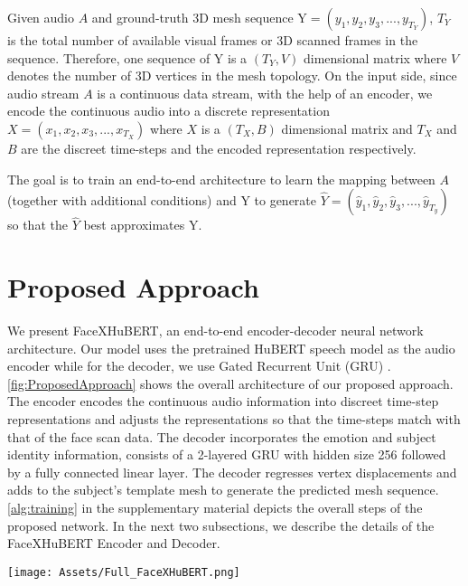 \documentclass[10pt,twocolumn,letterpaper]{article}
\begin{document}
Given audio $A$ and ground-truth 3D mesh sequence Y$ = (y_1, y_2, y_3,..., y_{T_Y})$, $T_Y$ is the total number of available visual frames or 3D scanned frames in the sequence. Therefore, one sequence of Y is a $(T_Y, V)$ dimensional matrix where $V$ denotes the number of 3D vertices in the mesh topology. On the input side, since audio stream $A$ is a continuous data stream, with the help of an encoder, we encode the continuous audio into a discrete representation $X = (x_1, x_2, x_3,..., x_{T_X})$ where $X$ is a $(T_X, B)$ dimensional matrix and $T_X$ and $B$ are the discreet time-steps and the encoded representation respectively. 

The goal is to train an end-to-end architecture to learn the mapping between $A$ (together with additional conditions) and Y to generate $\hat{Y} = (\hat{y}_1, \hat{y}_2,\hat{y}_3,..., \hat{y}_{T_y})$ so that the $\hat{Y}$ best approximates Y. 

\section{Proposed Approach}
\label{sec:proposedapproach}
We present FaceXHuBERT, an end-to-end encoder-decoder neural network architecture. Our model uses the pretrained HuBERT speech model as the audio encoder while for the decoder, we use Gated Recurrent Unit (GRU) \cite{GRU}. \cref{fig:ProposedApproach} shows the overall architecture of our proposed approach. The encoder encodes the continuous audio information into discreet time-step representations and adjusts the representations so that the time-steps match with that of the face scan data. The decoder incorporates the emotion and subject identity information, consists of a 2-layered GRU with hidden size 256 followed by a fully connected linear layer. The decoder regresses vertex displacements and adds to the subject's template mesh to generate the predicted mesh sequence.  \cref{alg:training} in the supplementary material depicts the overall steps of the proposed network. In the next two subsections, we describe the details of the FaceXHuBERT Encoder and Decoder.

\begin{figure*}
  \centering
  \texttt{[image: Assets/Full\_FaceXHuBERT.png]}
  \caption{\textbf{FaceXHuBERT:} The encoder encodes the audio waveform $A$ and produces discreet frame level embedding. The Input Representation Adjustment module in the encoder adjusts the encoded information with the output 4D scan data and produces $X$ such that $T_X = T_Y = T$. The Decoder takes in $X$ and with the help of the 2-layered 256 hidden sized GRU, produces the hidden representation $H$. Additional conditions such as the speaker identity and emotion label are embedded and multiplied with $H$ before the hidden representation is decoded into vertex displacement values and added to the corresponding subject's neutral face to produce the animation output $\hat{Y}$. The loss function is computed based on $\hat{Y}$ and ground-truth (GT), Y.}
  \label{fig:ProposedApproach}
\end{figure*}
\end{document}
